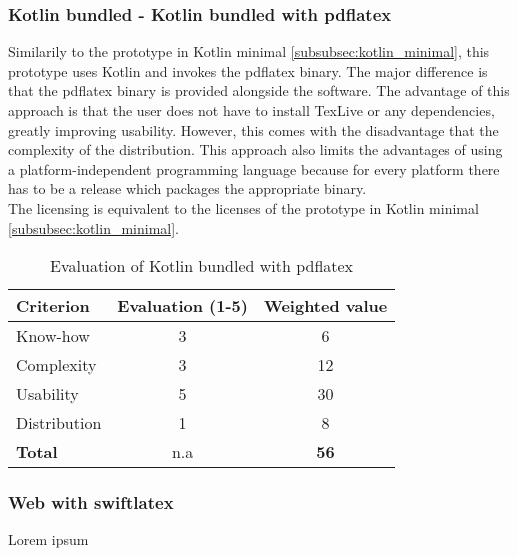 \subsubsection{Kotlin bundled - Kotlin bundled with pdflatex}
\label{sec:kotlin_bundled}
Similarily to the prototype in Kotlin minimal \ref{subsubsec:kotlin_minimal}, this prototype uses Kotlin and invokes the pdflatex binary. The major difference is that the pdflatex binary is provided alongside
the software. The advantage of this approach is that the user does not have to install TexLive or any dependencies, greatly improving usability. However, this comes with the disadvantage
that the complexity of the distribution. This approach also limits the advantages of using a platform-independent programming language because for every platform there has to be a release
which packages the appropriate binary.\\
The licensing is equivalent to the licenses of the prototype in Kotlin minimal \ref{subsubsec:kotlin_minimal}.\\
\begin{table}[H]
    \centering
    \begin{tabular}{|l|c|c|}
        \hline
        \textbf{Criterion} & \textbf{Evaluation (1-5)} & \textbf{Weighted value} \\
        \hline
        Know-how & 3 & 6 \\
        \hline
        Complexity & 3 & 12 \\
        \hline
        Usability & 5 & 30 \\
        \hline
        Distribution & 1 & 8 \\
        \hline
        \textbf{Total} & n.a & \textbf{56} \\
        \hline
    \end{tabular}
    \caption{Evaluation of Kotlin bundled with pdflatex}
    \label{table:kotlin_bundled_evaluation}
\end{table}

\subsubsection{Web with swiftlatex}
Lorem ipsum


